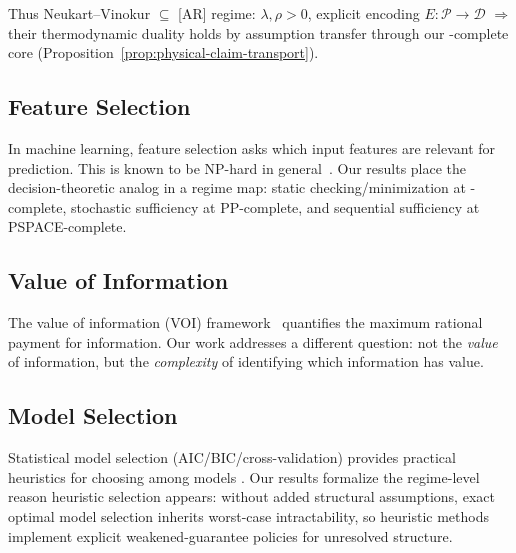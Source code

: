 Thus Neukart--Vinokur $\subseteq$ [AR] regime: $\lambda,\rho > 0$, explicit encoding $E:\mathcal{P}\to\mathcal{D}$ $\Rightarrow$ their thermodynamic duality holds by assumption transfer through our \coNP-complete core (Proposition~\ref{prop:physical-claim-transport}).

\subsection{Feature Selection}

In machine learning, feature selection asks which input features are relevant for prediction. This is known to be NP-hard in general~\cite{blum1997selection, guyon2003introduction}. Our results place the decision-theoretic analog in a regime map: static checking/minimization at \coNP-complete, stochastic sufficiency at PP-complete, and sequential sufficiency at PSPACE-complete.

\subsection{Value of Information}

The value of information (VOI) framework~\cite{howard1966information,raiffa1961applied} quantifies the maximum rational payment for information. Our work addresses a different question: not the \emph{value} of information, but the \emph{complexity} of identifying which information has value.

\subsection{Model Selection}

Statistical model selection (AIC/BIC/cross-validation) provides practical heuristics for choosing among models \cite{akaike1974new,schwarz1978estimating,stone1974cross}. Our results formalize the regime-level reason heuristic selection appears: without added structural assumptions, exact optimal model selection inherits worst-case intractability, so heuristic methods implement explicit weakened-guarantee policies for unresolved structure.


